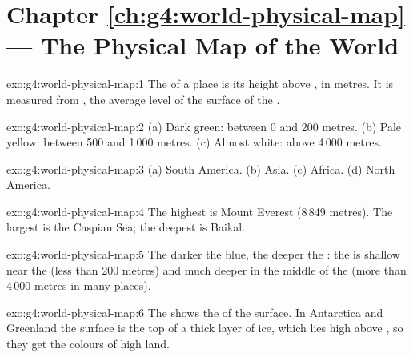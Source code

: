 \section*{Chapter \ref{ch:g4:world-physical-map} --- The Physical Map of the World}

\begin{solution}{exo:g4:world-physical-map:1}
The  of a place is its height above , in metres. It is
measured from , the average level of the surface of the .
\end{solution}

\begin{solution}{exo:g4:world-physical-map:2}
(a) Dark green: between 0 and 200 metres. (b) Pale yellow: between 500 and
1\,000 metres. (c) Almost white: above 4\,000 metres.
\end{solution}

\begin{solution}{exo:g4:world-physical-map:3}
(a) South America. (b) Asia. (c) Africa. (d) North America.
\end{solution}

\begin{solution}{exo:g4:world-physical-map:4}
The highest  is Mount Everest (8\,849 metres). The largest  is
the Caspian Sea; the deepest  is  Baikal.
\end{solution}

\begin{solution}{exo:g4:world-physical-map:5}
The darker the blue, the deeper the : the  is shallow near the 
(less than 200 metres) and much deeper in the middle of the  (more
than 4\,000 metres in many places).
\end{solution}

\begin{solution}{exo:g4:world-physical-map:6}
The  shows the  of the surface. In Antarctica and
Greenland the surface is the top of a thick layer of ice, which lies high
above , so they get the colours of high land.
\end{solution}


